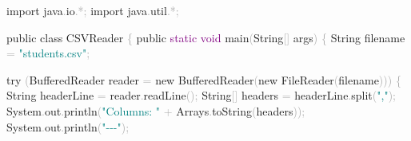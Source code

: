 \documentclass[
  justified,
  openright,
]{tufte-book}
\newcommand{\BuiltInTok}[1]{#1}
\newcommand{\ControlFlowTok}[1]{\textcolor{BrandBlue}{#1}}
\newcommand{\DataTypeTok}[1]{\textcolor{Purple}{#1}}
\newcommand{\FunctionTok}[1]{\textcolor{BrandBlue}{#1}}
\newcommand{\ImportTok}[1]{\textcolor{BrandAccent}{#1}}
\newcommand{\KeywordTok}[1]{\textcolor{BrandBlue}{#1}}
\newcommand{\NormalTok}[1]{#1}
\newcommand{\OperatorTok}[1]{\textcolor{DarkGray}{#1}}
\newcommand{\StringTok}[1]{\textcolor{Teal}{#1}}
\newenvironment{Shaded}{%
  \begin{snugshade}
}{%
  \end{snugshade}
}
\begin{document}
\begin{Shaded}
\begin{Highlighting}[]
\KeywordTok{import} \ImportTok{java}\OperatorTok{.}\ImportTok{io}\OperatorTok{.*;}
\KeywordTok{import} \ImportTok{java}\OperatorTok{.}\ImportTok{util}\OperatorTok{.*;}

\KeywordTok{public} \KeywordTok{class}\NormalTok{ CSVReader }\OperatorTok{\{}
    \KeywordTok{public} \DataTypeTok{static} \DataTypeTok{void} \FunctionTok{main}\OperatorTok{(}\BuiltInTok{String}\OperatorTok{[]}\NormalTok{ args}\OperatorTok{)} \OperatorTok{\{}
        \BuiltInTok{String}\NormalTok{ filename }\OperatorTok{=} \StringTok{"students.csv"}\OperatorTok{;}

        \ControlFlowTok{try} \OperatorTok{(}\BuiltInTok{BufferedReader}\NormalTok{ reader }\OperatorTok{=} \KeywordTok{new} \BuiltInTok{BufferedReader}\OperatorTok{(}\KeywordTok{new} \BuiltInTok{FileReader}\OperatorTok{(}\NormalTok{filename}\OperatorTok{)))} \OperatorTok{\{}
            \BuiltInTok{String}\NormalTok{ headerLine }\OperatorTok{=}\NormalTok{ reader}\OperatorTok{.}\FunctionTok{readLine}\OperatorTok{();}
            \BuiltInTok{String}\OperatorTok{[]}\NormalTok{ headers }\OperatorTok{=}\NormalTok{ headerLine}\OperatorTok{.}\FunctionTok{split}\OperatorTok{(}\StringTok{","}\OperatorTok{);}
            \BuiltInTok{System}\OperatorTok{.}\FunctionTok{out}\OperatorTok{.}\FunctionTok{println}\OperatorTok{(}\StringTok{"Columns: "} \OperatorTok{+} \BuiltInTok{Arrays}\OperatorTok{.}\FunctionTok{toString}\OperatorTok{(}\NormalTok{headers}\OperatorTok{));}
            \BuiltInTok{System}\OperatorTok{.}\FunctionTok{out}\OperatorTok{.}\FunctionTok{println}\OperatorTok{(}\StringTok{"{-}{-}{-}"}\OperatorTok{);}


\end{Highlighting}
\end{Shaded}
\end{document}
